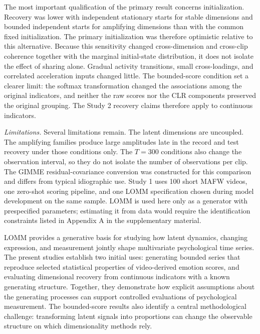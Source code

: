 \documentclass[
]{article}
\begin{document}
The most important qualification of the primary result concerns
initialization. Recovery was lower with independent stationary starts
for stable dimensions and bounded independent starts for amplifying
dimensions than with the common fixed initialization. The primary
initialization was therefore optimistic relative to this alternative.
Because this sensitivity changed cross-dimension and cross-clip
coherence together with the marginal initial-state distribution, it does
not isolate the effect of sharing alone. Gradual activity transitions,
small cross-loadings, and correlated acceleration inputs changed little.
The bounded-score condition set a clearer limit: the softmax
transformation changed the associations among the original indicators,
and neither the raw scores nor the CLR components preserved the original
grouping. The Study 2 recovery claims therefore apply to continuous
indicators.

\emph{Limitations.} Several limitations remain. The latent dimensions
are uncoupled. The amplifying families produce large amplitudes late in
the record and test recovery under those conditions only. The \(T=300\)
conditions also change the observation interval, so they do not isolate
the number of observations per clip. The GIMME residual-covariance
conversion was constructed for this comparison and differs from typical
idiographic use. Study 1 uses 100 short MAFW videos, one zero-shot
scoring pipeline, and one LOMM specification chosen during model
development on the same sample. LOMM is used here only as a generator
with prespecified parameters; estimating it from data would require the
identification constraints listed in Appendix A in the supplementary
material.

LOMM provides a generative basis for studying how latent dynamics,
changing expression, and measurement jointly shape multivariate
psychological time series. The present studies establish two initial
uses: generating bounded series that reproduce selected statistical
properties of video-derived emotion scores, and evaluating dimensional
recovery from continuous indicators with a known generating structure.
Together, they demonstrate how explicit assumptions about the generating
processes can support controlled evaluations of psychological
measurement. The bounded-score results also identify a central
methodological challenge: transforming latent signals into proportions
can change the observable structure on which dimensionality methods
rely.
\end{document}
